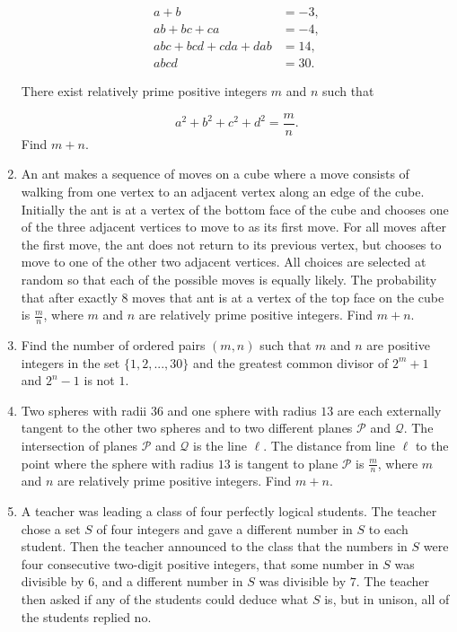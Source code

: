 \documentclass{article}
\begin{document}
\begin{enumerate}[label=\arabic*., itemsep=0.5em]
\begin{align*}
a + b &= -3, \\
ab + bc + ca &= -4, \\
abc + bcd + cda + dab &= 14, \\
abcd &= 30.
\end{align*}

There exist relatively prime positive integers \(m\) and \(n\) such that

\begin{equation*}
a^2 + b^2 + c^2 + d^2 = \frac{m}{n}.
\end{equation*}
Find \(m + n\).\par \vspace{0.5em}\item An ant makes a sequence of moves on a cube where a move consists of walking from one vertex to an adjacent vertex along an edge of the cube. Initially the ant is at a vertex of the bottom face of the cube and chooses one of the three adjacent vertices to move to as its first move. For all moves after the first move, the ant does not return to its previous vertex, but chooses to move to one of the other two adjacent vertices. All choices are selected at random so that each of the possible moves is equally likely. The probability that after exactly \(8\) moves that ant is at a vertex of the top face on the cube is \(\frac{m}{n}\), where \(m\) and \(n\) are relatively prime positive integers. Find \(m + n.\)\par \vspace{0.5em}\item Find the number of ordered pairs \((m, n)\) such that \(m\) and \(n\) are positive integers in the set \(\{1, 2, ..., 30\}\) and the greatest common divisor of \(2^m + 1\) and \(2^n - 1\) is not \(1\).\par \vspace{0.5em}\item Two spheres with radii \(36\) and one sphere with radius \(13\) are each externally tangent to the other two spheres and to two different planes \(\mathcal{P}\) and \(\mathcal{Q}\). The intersection of planes \(\mathcal{P}\) and \(\mathcal{Q}\) is the line \(\ell\). The distance from line \(\ell\) to the point where the sphere with radius \(13\) is tangent to plane \(\mathcal{P}\) is \(\tfrac{m}{n}\), where \(m\) and \(n\) are relatively prime positive integers. Find \(m + n\).\par \vspace{0.5em}\item A teacher was leading a class of four perfectly logical students. The teacher chose a set \(S\) of four integers and gave a different number in \(S\) to each student. Then the teacher announced to the class that the numbers in \(S\) were four consecutive two-digit positive integers, that some number in \(S\) was divisible by \(6\), and a different number in \(S\) was divisible by \(7\). The teacher then asked if any of the students could deduce what \(S\) is, but in unison, all of the students replied no.


\end{enumerate}
\end{document}

